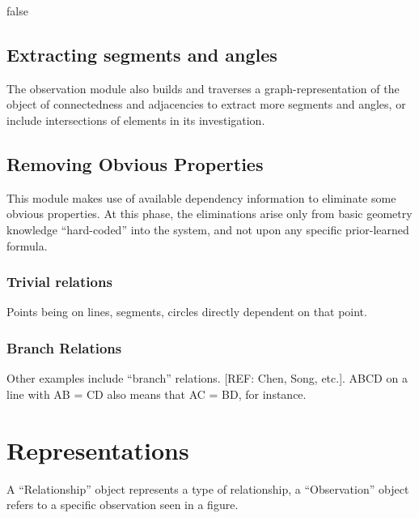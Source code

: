 
\if false

\subsection{Extracting segments and angles}

The observation module also builds and traverses a
graph-representation of the object of connectedness and adjacencies to
extract more segments and angles, or include intersections of elements
in its investigation.

\subsection{Removing Obvious Properties}

This module makes use of available dependency information to eliminate
some obvious properties. At this phase, the eliminations arise only
from basic geometry knowledge ``hard-coded'' into the system, and not
upon any specific prior-learned formula.

\subsubsection{Trivial relations}

Points being on lines, segments, circles directly dependent on that point.

\subsubsection{Branch Relations}

Other examples include ``branch'' relations. [REF: Chen, Song,
  etc.]. ABCD on a line with AB = CD also means that AC = BD, for instance.

\section{Representations}

A ``Relationship'' object represents a type of relationship, a
``Observation'' object refers to a specific observation seen in a
figure.

\fi
